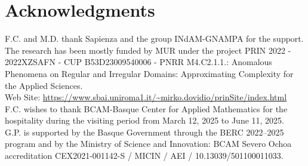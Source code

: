 \documentclass[11pt,a4paper]{article}
\theoremstyle{definition}
\theoremstyle{remark}
\begin{document}
\section*{Acknowledgments}

F.C. and M.D. thank Sapienza and the group INdAM-GNAMPA for the support.  
The research has been mostly funded by MUR under the project PRIN 2022 - 2022XZSAFN - CUP B53D23009540006 - PNRR M4.C2.1.1.: Anomalous Phenomena on Regular and Irregular Domains:
Approximating Complexity for the Applied Sciences. \\
Web Site: \url{https://www.sbai.uniroma1.it/~mirko.dovidio/prinSite/index.html} \\
F.C. wishes to thank BCAM-Basque Center for Applied Mathematics for the hospitality during the visiting period from March 12, 2025 to June 11, 2025. \\
G.P. is supported by the Basque Government through the BERC 2022--2025 program and by the Ministry of Science and Innovation: BCAM Severo Ochoa accreditation CEX2021-001142-S / MICIN / AEI / 10.13039/501100011033.
\end{document}
